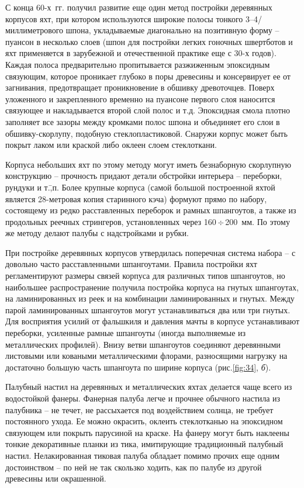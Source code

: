 \documentclass[a4paper, 12pt, twoside, final, book, russian, fittopage, cyremdash]{ncc}
\newcommand{\otdo}{\,\ensuremath{\div}\,}
\newcommand{\ris}[1]{\ref{fig:#1}}
\begin{document}
С конца 60-х~гг. получил развитие еще один метод постройки деревянных корпусов яхт, при котором используются широкие полосы тонкого 3--4\-/миллиметрового шпона, укладываемые диагонально на позитивную форму \--- пуансон в несколько слоев (шпон для постройки легких гоночных швертботов и яхт применяется в зарубежной и отечественной практике еще с 30-х годов). Каждая полоса предварительно пропитывается разжиженным эпоксидным связующим, которое проникает глубоко в поры древесины и консервирует ее от загнивания, предотвращает проникновение в обшивку древоточцев. Поверх уложенного и закрепленного временно на пуансоне первого слоя наносится связующее и накладывается второй слой полос и т.д. Эпоксидная смола плотно заполняет все зазоры между кромками полос шпона и объединяет его слои в обшивку-скорлупу, подобную стеклопластиковой. Снаружи корпус может быть покрыт лаком или краской либо оклеен слоем стеклоткани. 

Корпуса небольших яхт по этому методу могут иметь безнаборную скорлупную конструкцию \--- прочность придают детали обстройки интерьера \--- переборки, рундуки и т.\=,п. Более крупные корпуса (самой большой построенной яхтой является 28-метровая копия старинного кэча) формуют прямо по набору, состоящему из редко расставленных переборок и рамных шпангоутов, а также из продольных реечных стрингеров, установленных через 160\otdo 200~мм. По этому же методу делают палубы с надстройками и рубки.

При постройке деревянных корпусов утвердилась поперечная система набора \--- с довольно часто расставленными шпангоутами. Правила постройки яхт регламентируют размеры связей корпуса для различных типов шпангоутов, но наибольшее распространение получила постройка корпуса на гнутых шпангоутах, на ламинированных из реек и на комбинации ламинированных и гнутых. Между парой ламинированных шпангоутов могут устанавливаться два или три гнутых. Для восприятия усилий от фальшкиля и давления мачты в корпусе устанавливают переборки, усиленные рамные шпангоуты (иногда выполняемые из металлических профилей). Внизу ветви шпангоутов соединяют деревянными листовыми или коваными металлическими флорами, разносящими нагрузку на достаточно большую часть шпангоута по ширине корпуса (рис.\ris{34}, \textit{б}).

Палубный настил на деревянных и металлических яхтах делается чаще всего из водостойкой фанеры. Фанерная палуба легче и прочнее обычного настила из палубника \--- не течет, не рассыхается под воздействием солнца, не требует постоянного ухода. Ее можно окрасить, оклеить стеклотканью на эпоксидном связующем или покрыть парусиной на краске. На фанеру могут быть наклеены тонкие декоративные планки из тика, имитирующие традиционный палубный настил. Нелакированная тиковая палуба обладает помимо прочих еще одним достоинством \--- по ней не так скользко ходить, как по палубе из другой древесины или окрашенной.
 
\end{document}
